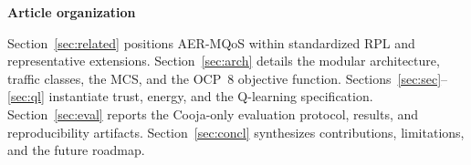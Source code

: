 \noindent\textbf{Article organization}\par
Section~\ref{sec:related} positions AER-MQoS within standardized RPL and representative extensions. Section~\ref{sec:arch} details the modular architecture, traffic classes, the MCS, and the OCP~8 objective function. Sections~\ref{sec:sec}--\ref{sec:ql} instantiate trust, energy, and the Q-learning specification. Section~\ref{sec:eval} reports the Cooja-only evaluation protocol, results, and reproducibility artifacts. Section~\ref{sec:concl} synthesizes contributions, limitations, and the future roadmap.